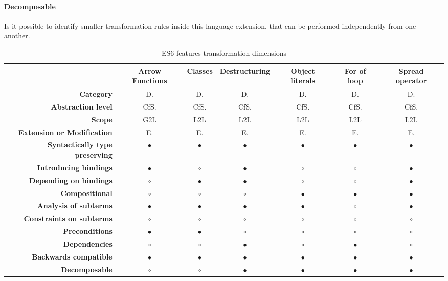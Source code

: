 \paragraph{Decomposable}
Is it possible to identify smaller transformation rules inside this language extension, that can be performed independently from one another.

\begin{landscape}		
\centering

\begin{table}[h]
\caption{ES6 features transformation dimensions}
\label{full-table}
\begin{tabular}{rcccccc}
\hline
& {\bf Arrow Functions} & {\bf Classes} & {\bf Destructuring} & {\bf Object literals} & {\bf For of loop} & {\bf Spread operator} \\ \hline
{\bf Category} & D. & D. & D. & D. & D. & D. \\
{\bf Abstraction level} & CfS. & CfS. & CfS. & CfS. & CfS. & CfS. \\
{\bf Scope} & G2L & L2L & L2L & L2L & L2L & L2L \\
{\bf Extension or Modification} & E. & E. & E. & E. & E. & E. \\
{\bf Syntactically type preserving} & $\bullet$ & $\bullet$ & $\bullet$ & $\bullet$ & $\bullet$ & $\bullet$ \\
{\bf Introducing bindings} & $\bullet$ & $\circ$ & $\bullet$ & $\circ$ & $\circ$ & $\bullet$ \\
{\bf Depending on bindings} & $\circ$ & $\bullet$ & $\bullet$ & $\circ$ & $\circ$ & $\bullet$ \\
{\bf Compositional} & $\circ$ & $\circ$ & $\circ$ & $\bullet$ & $\bullet$ & $\bullet$ \\
{\bf Analysis of subterms} & $\bullet$ & $\bullet$ & $\bullet$ & $\bullet$ & $\circ$ & $\bullet$  \\
{\bf Constraints on subterms} & $\circ$ & $\circ$ & $\circ$ & $\circ$ & $\circ$ & $\circ$   \\
{\bf Preconditions} & $\bullet$ & $\bullet$ & $\circ$ & $\circ$ & $\circ$ & $\circ$   \\
{\bf Dependencies}  & $\circ$ & $\circ$ & $\bullet$ & $\circ$ & $\bullet$ & $\circ$   \\
{\bf Backwards compatible} & $\bullet$ & $\bullet$ & $\bullet$ & $\bullet$ & $\bullet$ & $\bullet$  \\
{\bf Decomposable} & $\circ$ & $\circ$ & $\bullet$ & $\bullet$ & $\bullet$ & $\bullet$  \\ \hline
\end{tabular}
\vspace*{0.5cm}
\newline


\end{table}
\end{landscape}
